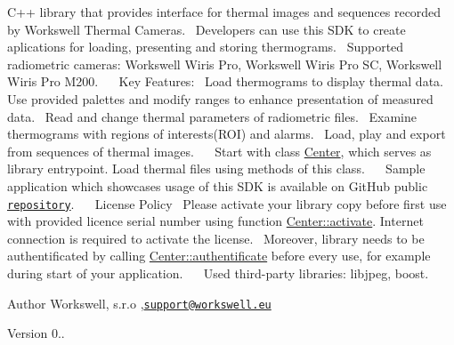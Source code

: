 C++ library that provides interface for thermal images and sequences recorded by Workswell Thermal Cameras.~\newline
Developers can use this S\+DK to create aplications for loading, presenting and storing thermograms.~\newline
Supported radiometric cameras\+: Workswell Wiris Pro, Workswell Wiris Pro SC, Workswell Wiris Pro M200.~\newline
~\newline
Key Features\+:~\newline
 Load thermograms to display thermal data.~\newline
 Use provided palettes and modify ranges to enhance presentation of measured data.~\newline
 Read and change thermal parameters of radiometric files.~\newline
 Examine thermograms with regions of interests(\+R\+O\+I) and alarms.~\newline
 Load, play and export from sequences of thermal images.~\newline
~\newline
Start with class \hyperlink{classwtl_1_1_center}{Center}, which serves as library entrypoint. Load thermal files using methods of this class.~\newline
~\newline
Sample application which showcases usage of this S\+DK is available on Git\+Hub public \href{https://github.com/SoftwareWorkswell/wwp-data-sdk-sample}{\tt repository}.~\newline
~\newline
License Policy~\newline
Please activate your library copy before first use with provided licence serial number using function \hyperlink{classwtl_1_1_center_a96188b25e9a7d0b2c3ef54bae69f6190}{Center\+::activate}. Internet connection is required to activate the license.~\newline
Moreover, library needs to be authentificated by calling \hyperlink{classwtl_1_1_center_a1f1a7e622802706a8eef7ab781bc8efd}{Center\+::authentificate} before every use, for example during start of your application.~\newline
~\newline
Used third-\/party libraries\+: libjpeg, boost.~\newline
~\newline
\begin{DoxyAuthor}{Author}
Workswell, s.\+r.\+o ,\href{mailto:support@workswell.eu}{\tt support@workswell.\+eu} 
\end{DoxyAuthor}
\begin{DoxyVersion}{Version}
0.. 
\end{DoxyVersion}
